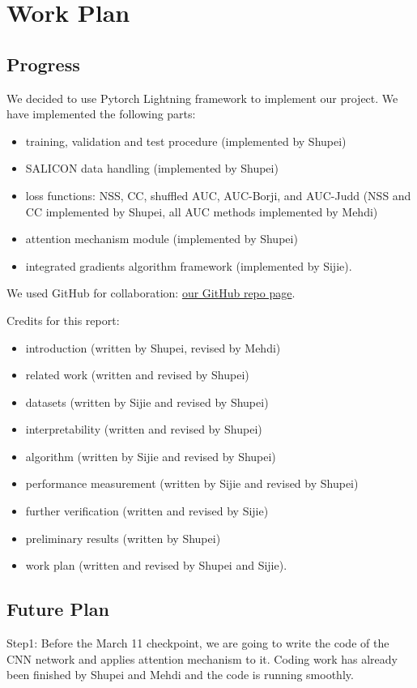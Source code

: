\documentclass[12pt]{article}
\begin{document}
\section{Work Plan}
\subsection{Progress}
We decided to use Pytorch Lightning framework \cite{falcon2019pytorch} to implement our project.
We have implemented the following parts:
\begin{itemize}
    \item training, validation and test procedure (implemented by Shupei)
    \item SALICON data handling (implemented by Shupei)
    \item loss functions: NSS, CC, shuffled AUC, AUC-Borji, and AUC-Judd (NSS and CC implemented by Shupei, all AUC methods implemented by Mehdi)
    \item attention mechanism module (implemented by Shupei)
    \item integrated gradients algorithm framework (implemented by Sijie).
\end{itemize}
We used GitHub for collaboration: \href{https://github.com/Freddiechang/CMPUT566}{our GitHub repo page}.

Credits for this report:
\begin{itemize}
    \item introduction (written by Shupei, revised by Mehdi)
    \item related work (written and revised by Shupei)
    \item datasets (written by Sijie and revised by Shupei)
    \item interpretability (written and revised by Shupei)
    \item algorithm (written by Sijie and revised by Shupei)
    \item performance measurement (written by Sijie and revised by Shupei)
    \item further verification (written and revised by Sijie)
    \item preliminary results (written by Shupei)
    \item work plan (written and revised by Shupei and Sijie).
\end{itemize}

\subsection{Future Plan}
Step1: Before the March 11 checkpoint, we are going to write the code of the CNN network and applies attention mechanism to it. Coding work has already been finished by Shupei and Mehdi and the code is running smoothly.
\end{document}
